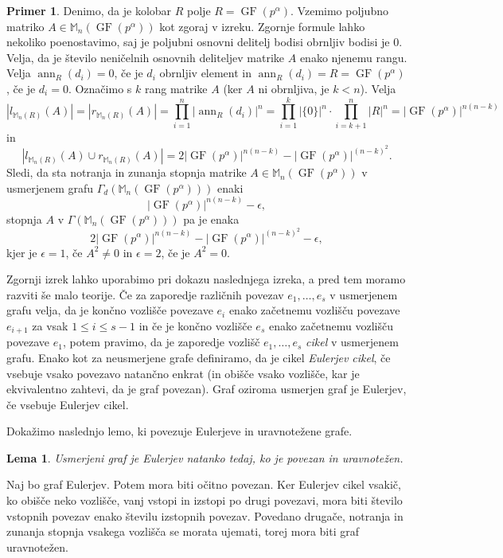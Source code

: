 \documentclass[a4paper, 12pt]{amsart}
\theoremstyle{definition} %
\newtheorem{primer}[definicija]{Primer}
\theoremstyle{plain} %
\newtheorem{lema}[definicija]{Lema}
\newcommand{\M}{\mathbb M}
\DeclareMathOperator{\ann}{ann}
\DeclareMathOperator{\GF}{GF}
\begin{document}
\begin{primer}
Denimo, da je kolobar $R$ polje $R=\GF(p^{\alpha})$. Vzemimo poljubno matriko $A\in \M_n(\GF(p^{\alpha}))$ kot zgoraj v izreku. Zgornje formule lahko nekoliko poenostavimo, saj je poljubni osnovni delitelj bodisi obrnljiv bodisi je 0. Velja, da je število neničelnih osnovnih deliteljev matrike $A$ enako njenemu rangu. Velja $\ann_R(d_i) = 0$, če je $d_i$ obrnljiv element in $\ann_R(d_i) = R=\GF(p^{\alpha})$, če je $d_i=0$. Označimo s $k$ rang matrike $A$ (ker $A$ ni obrnljiva, je $k<n$). Velja 
$$
|l_{\M_n(R)}(A)| = |r_{\M_n(R)}(A)|=\prod_{i=1}^n|\ann_R(d_i)|^n = \prod_{i=1}^k |\{0\}|^n\cdot \prod_{i=k+1}^n |R|^{n} =|\GF(p^{\alpha})|^{n(n-k)}
$$
in
$$
|l_{\M_n(R)} (A) \cup r_{\M_n(R)}(A)| = 2|\GF(p^{\alpha})|^{n(n-k)} - |\GF(p^{\alpha})|^{(n-k)^2}.
$$
Sledi, da sta notranja in zunanja stopnja matrike $A\in \M_n(\GF(p^{\alpha}))$ v usmerjenem grafu $\Gamma_d(\M_n(\GF(p^{\alpha})))$ enaki 
$$
|\GF(p^{\alpha})|^{n(n-k)} - \epsilon,
$$
stopnja $A$ v $\Gamma (\M_n(\GF(p^{\alpha})))$ pa je enaka
$$
 2|\GF(p^{\alpha})|^{n(n-k)} - |\GF(p^{\alpha})|^{(n-k)^2} - \epsilon,
$$
kjer je $\epsilon=1$, če $A^2\neq 0$ in $\epsilon = 2$, če je $A^2 = 0$. 
\end{primer}

Zgornji izrek lahko uporabimo pri dokazu naslednjega izreka, a pred tem moramo razviti še malo teorije. Če za zaporedje različnih povezav $e_1, \dots, e_s$ v usmerjenem grafu velja, da je končno vozlišče povezave $e_i$ enako začetnemu vozlišču povezave $e_{i+1}$ za vsak $1 \le i \le s-1$ in če je končno vozlišče $e_s$ enako začetnemu vozlišču povezave $e_1$, potem pravimo, da je zaporedje vozlišč $e_1,\dots,e_s$ \emph{cikel} v usmerjenem grafu. Enako kot za neusmerjene grafe definiramo, da je cikel \emph{Eulerjev cikel}, če vsebuje vsako povezavo natančno enkrat (in obišče vsako vozlišče, kar je ekvivalentno zahtevi, da je graf povezan). Graf oziroma usmerjen graf je Eulerjev, če vsebuje Eulerjev cikel.

Dokažimo naslednjo lemo, ki povezuje Eulerjeve in uravnotežene grafe.
\begin{lema}
\label{usmerjenGrafEuler}
Usmerjeni graf je Eulerjev natanko tedaj, ko je povezan in uravnotežen.
\end{lema}

\proof
Naj bo graf Eulerjev. Potem mora biti očitno povezan. Ker Eulerjev cikel vsakič, ko obišče neko vozlišče, vanj vstopi in izstopi po drugi povezavi, mora biti število vstopnih povezav enako številu izstopnih povezav. Povedano drugače, notranja in zunanja stopnja vsakega vozlišča se morata ujemati, torej mora biti graf uravnotežen.
\end{document}
